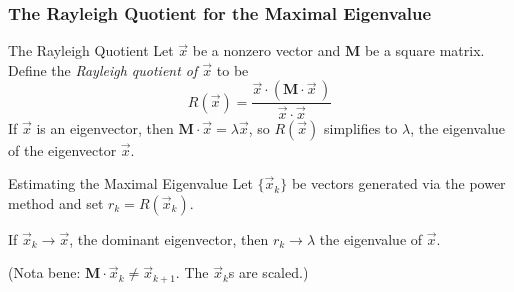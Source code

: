 \documentclass[10pt,handout,hyperref={colorlinks=true,linkcolor=blue,citecolor=citelink,urlcolor=gray}]{beamer}
\newcounter{e_temp}
\begin{document}
\begin{frame}[label=Rayleigh]
\frametitle{The Rayleigh Quotient for the Maximal Eigenvalue}
\begin{block}{The Rayleigh Quotient\footnotemark}
Let $\vec{x}$ be a nonzero vector and $\mathbf{M}$ be a square matrix. Define the \emph{Rayleigh quotient of $\vec{x}$} to be
\[	R(\vec{x}) = \frac{\vec{x} \cdot (\mathbf{M}\cdot\vec{x}\,)}{\vec{x}\cdot\vec{x}}	\]
If $\vec{x}$ is an eigenvector, then $\mathbf{M}\cdot\vec{x} = \lambda\vec{x}$, so $R(\vec{x})$ simplifies to $\lambda$, the eigenvalue of the eigenvector $\vec{x}$. 
\end{block}
\vfill

\begin{block}{Estimating the Maximal Eigenvalue}
Let $\{\vec{x}_k\}$ be vectors generated via the power method and set $r_k=R(\vec{x}_k)$.
\vspace{1ex}

If $\vec{x}_k \to \vec{x}$, the dominant eigenvector, then $r_k\to \lambda$ the eigenvalue of $\vec{x}$.
\vspace{2ex}

{\footnotesize (Nota bene: $\mathbf{M}\cdot\vec{x}_k \ne \vec{x}_{k+1}$. The $\vec{x}_{k}$s are scaled.)}
\end{block}
\vfill
{}
\end{frame}
\end{document}
